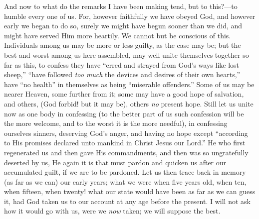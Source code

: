 And now to what do the remarks I have been making
tend, but to this?—to humble every one of us. For,
however faithfully we have obeyed God, and however early
we began to do so, surely we might have begun sooner than
we did, and might have served Him more heartily. We
cannot but be conscious of this. Individuals among us may
be more or less guilty, as the case may be; but the best
and worst among us here assembled, may well unite
themselves together so far as this, to confess they have
``erred and strayed from God's ways like lost
sheep,'' ``have followed \emph{too much} the devices and
desires of their own hearts,'' have ``no
health'' in themselves as being ``miserable
offenders.'' Some of us may be nearer Heaven, some
further from it; some may have a good hope of salvation,
and others, (God forbid! but it may be), others \emph{no}
present hope. Still let us unite now as one body in
confessing (to the better part of us such confession will
be the more welcome, and to the worst it is the more
needful), in confessing ourselves sinners, deserving
God's anger, and having no hope except ``according to
His promises declared unto mankind in Christ Jesus our
Lord.'' He who first regenerated us and then gave His
commandments, and then was so ungratefully deserted by
us, He again it is that must pardon and quicken us after
our accumulated guilt, if we are to be pardoned. Let us
then trace back in memory (as far as we can) our early
years; what we were when five years old, when ten, when
fifteen, when twenty! what our state would have been as
far as we can guess it, had God taken us to our account
at any age before the present. I will not ask how it
would go with us, were we \emph{now} taken; we will
suppose the best.

